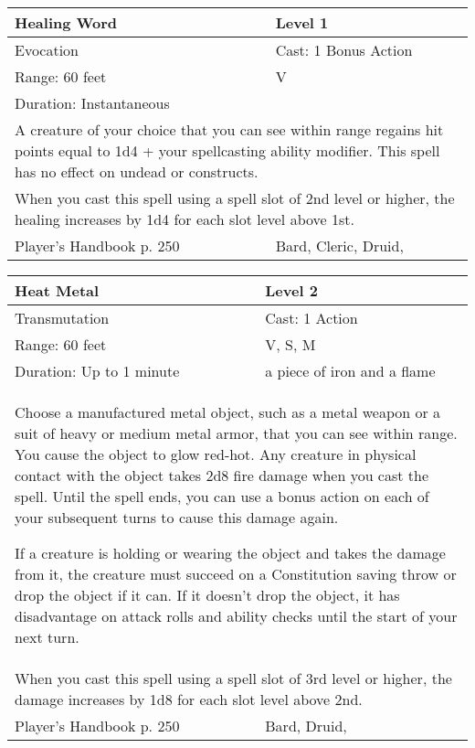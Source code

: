 \documentclass[11pt]{report}
\begin{document}
\begin{table}[H]
	\begin{tabular}{||p{6cm}|p{6cm}||}
		\hline\hline
		\bf{Healing Word} & Level 1\\ \hline
		Evocation & Cast: 1 Bonus Action\\ \hline
		Range: 60 feet & V\\ \hline
		Duration: Instantaneous & \\ \hline
		\multicolumn{2}{||p{12cm}||}{A creature of your choice that you can see within range regains hit points equal to 1d4 + your spellcasting ability modifier.
This spell has no effect on undead or constructs.}\\ \hline
		\multicolumn{2}{||p{12cm}||}{When you cast this spell using a spell slot of 2nd level or higher, the healing increases by 1d4 for each slot level above 1st.}\\ \hline
Player's Handbook p. 250 & Bard, Cleric, Druid, \\ \hline\hline
	\end{tabular}
\end{table}

\begin{table}[H]
	\begin{tabular}{||p{6cm}|p{6cm}||}
		\hline\hline
		\bf{Heat Metal} & Level 2\\ \hline
		Transmutation & Cast: 1 Action\\ \hline
		Range: 60 feet & V, S, M\\ \hline
		Duration: Up to 1 minute & a piece of iron and a flame\\ \hline
		\multicolumn{2}{||p{12cm}||}{Choose a manufactured metal object, such as a metal weapon or a suit of heavy or medium metal armor, that you can see within range. You cause the object to glow red-hot. Any creature in physical contact with the object takes 2d8 fire damage when you cast the spell. Until the spell ends, you can use a bonus action on each of your subsequent turns to cause this damage again.

If a creature is holding or wearing the object and takes the damage from it, the creature must succeed on a Constitution saving throw or drop the object if it can. If it doesn’t drop the object, it has disadvantage on attack rolls and ability checks until the start of your next turn.}\\ \hline
		\multicolumn{2}{||p{12cm}||}{When you cast this spell using a spell slot of 3rd level or higher, the damage increases by 1d8 for each slot level above 2nd.}\\ \hline
Player's Handbook p. 250 & Bard, Druid, \\ \hline\hline
	\end{tabular}
\end{table}
\end{document}
